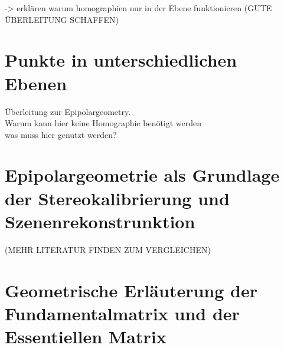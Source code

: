 -> erklären warum homographien nur in der Ebene funktionieren
(GUTE ÜBERLEITUNG SCHAFFEN)


\section{Punkte in unterschiedlichen Ebenen}

Überleitung zur Epipolargeometry.\\
Warum kann hier keine Homographie benötigt werden\\
was muss hier genutzt werden?

\section{Epipolargeometrie als Grundlage der Stereokalibrierung und Szenenrekonstrunktion}


(MEHR LITERATUR FINDEN ZUM VERGLEICHEN)

\section{Geometrische Erläuterung der Fundamentalmatrix und der Essentiellen Matrix }







